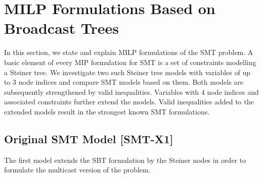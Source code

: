 \section{MILP Formulations Based on Broadcast Trees}
\label{sec:ILP}

In this section, we state and explain MILP formulations of the SMT problem. A basic element of every MIP formulation for SMT is a set of constraints modelling a Steiner tree. We investigate two such Steiner tree models with variables of up to 3 node indices and compare SMT models based on them. Both models are subsequently strengthened by valid inequalities. Variables with 4 node indices and associated constraints further extend the models. Valid inequalities added to the extended models result in the strongest known SMT formulations.
\subsection{Original SMT Model [SMT-X1]}
The first model extends the SBT formulation \cite{Haugland12Dual} by the Steiner nodes in order to formulate the multicast version of the problem. 
